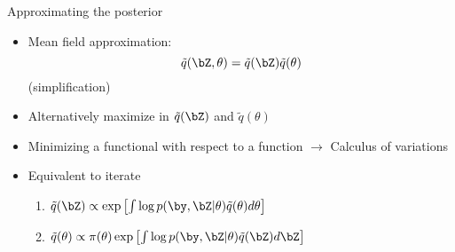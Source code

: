 
\begin{frame}{Approximating the posterior}

\begin{itemize}
 \item Mean field approximation:  $$\tilde{q}(\bZ, \theta) = \tilde{q}(\bZ) \tilde{q}( \theta)$$ (simplification)
 \item Alternatively maximize in $ \tilde{q}(\bZ)$ and $ \tilde{q}(\theta)$
 \item Minimizing a functional with respect to a function $\rightarrow$ Calculus of variations
 \item Equivalent to iterate
 
 \begin{enumerate}
 \item $\tilde{q}(\bZ) \propto \exp \left[\int \log  p(\by, \bZ |  \theta) \tilde{q}(\theta) d\theta \right]$
 \item $\tilde{q}(\theta) \propto \pi(\theta) \exp \left[\int \log  p(\by, \bZ |  \theta) \tilde{q}(\bZ) d\bZ \right]$
\end{enumerate}

\end{itemize}  

\end{frame}


% 
% 
%  
%  
% 

